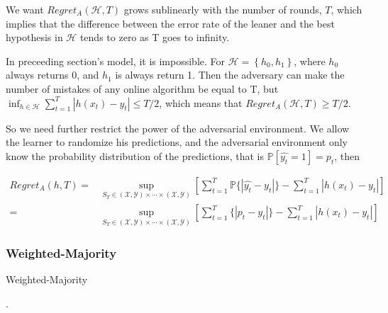 We want $ Regret_{A}(\mathcal{H}, T) $ grows sublinearly with the number of rounds, $ T $, which implies that the difference between the error rate of the leaner and the best hypothesis in $ \mathcal{H} $ tends to zero as T goes to infinity.

In preceeding section's model, it is impossible. For $ \mathcal{H} = \left\{ h_0, h_1 \right\} $, where $ h_0 $ always returns 0, and $ h_1 $ is always return 1. Then the adversary can make the number of mistakes of any online algorithm be equal to T, but $ \inf_{h \in \mathcal{H}} \sum^{T}_{t=1} \left| h(x_t) - y_t \right| \le T/2$, which means that $ Regret_{A}(\mathcal{H}, T) \ge T/2 $.

So we need further restrict the power of the adversarial environment. We allow the learner to randomize his predictions, and the adversarial environment only know the probability distribution of the predictions, that is $ \mathbb{P}\left[ \hat{y_t} = 1 \right] = p_t $, then

\begin{align*}
    Regret_{A}(h, T) =& \sup_{S_T \in (\mathcal{X}, \mathcal{Y})\times\cdots\times(\mathcal{X}, \mathcal{Y})}
    \left[ \sum^{T}_{t=1} \mathbb{P} \{\left| \hat{y_t} - y_t \right|\} - \sum^{T}_{t = 1} \left| h(x_t) - y_t \right| \right]\\
    =& \sup_{S_T \in (\mathcal{X}, \mathcal{Y})\times\cdots\times(\mathcal{X}, \mathcal{Y})}
    \left[ \sum^{T}_{t=1} \{\left| p_t - y_t \right|\} - \sum^{T}_{t = 1} \left| h(x_t) - y_t \right| \right]
\end{align*}

\subsubsection{Weighted-Majority}%

\begin{algorithm}[H]
    \caption{Weighted-Majority}
    \begin{algorithmic}
        \EndFor.
    \end{algorithmic}
\end{algorithm}

